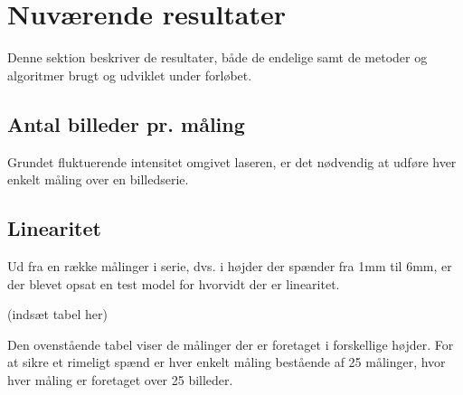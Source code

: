 \section{Nuværende resultater}

Denne sektion beskriver de resultater, både de endelige samt de metoder og algoritmer brugt og udviklet under forløbet.


\subsection{Antal billeder pr. måling}

Grundet fluktuerende intensitet omgivet laseren, er det nødvendig at udføre hver enkelt måling over en billedserie.



\subsection{Linearitet}

Ud fra en række målinger i serie, dvs. i højder der spænder fra 1mm til 6mm, er der blevet opsat en test model for hvorvidt der er linearitet.


(indsæt tabel her)


Den ovenstående tabel viser de målinger der er foretaget i forskellige højder. For at sikre et rimeligt spænd er hver enkelt måling bestående af 25 målinger, hvor hver måling er foretaget over 25 billeder.

 